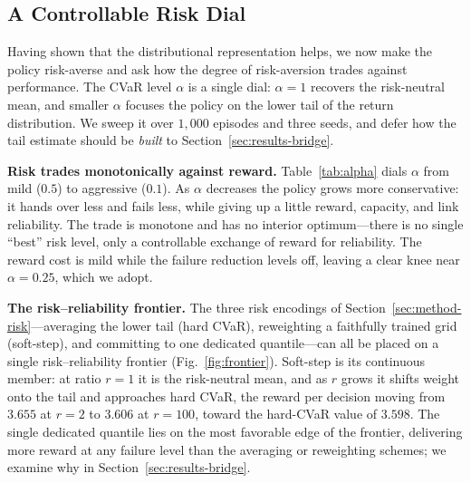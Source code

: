 \documentclass[conference]{IEEEtran}
\begin{document}
\subsection{A Controllable Risk Dial}
\label{sec:results-risk}
Having shown that the distributional representation helps, we now make the policy
risk-averse and ask how the degree of risk-aversion trades against performance.
The CVaR level $\alpha$ is a single dial: $\alpha=1$ recovers the risk-neutral
mean, and smaller $\alpha$ focuses the policy on the lower tail of the return
distribution. We sweep it over $1{,}000$ episodes and three seeds, and defer how
the tail estimate should be \emph{built} to Section~\ref{sec:results-bridge}.

\textbf{Risk trades monotonically against reward.} Table~\ref{tab:alpha} dials
$\alpha$ from mild ($0.5$) to aggressive ($0.1$). As $\alpha$ decreases the policy
grows more conservative: it hands over less and fails less, while giving up a
little reward, capacity, and link reliability. The trade is monotone and has no
interior optimum---there is no single ``best'' risk level, only a controllable
exchange of reward for reliability. The reward cost is mild while the failure
reduction levels off, leaving a clear knee near $\alpha=0.25$, which we adopt.

\textbf{The risk--reliability frontier.} The three risk encodings of
Section~\ref{sec:method-risk}---averaging the lower tail (hard CVaR), reweighting a
faithfully trained grid (soft-step), and committing to one dedicated
quantile---can all be placed on a single risk--reliability frontier
(Fig.~\ref{fig:frontier}). Soft-step is its continuous member: at ratio $r=1$ it is
the risk-neutral mean, and as $r$ grows it shifts weight onto the tail and
approaches hard CVaR, the reward per decision moving from $3.655$ at $r=2$ to
$3.606$ at $r=100$, toward the hard-CVaR value of $3.598$. The single dedicated
quantile lies on the most favorable edge of the frontier, delivering more reward at
any failure level than the averaging or reweighting schemes; we examine why in
Section~\ref{sec:results-bridge}.
\end{document}
